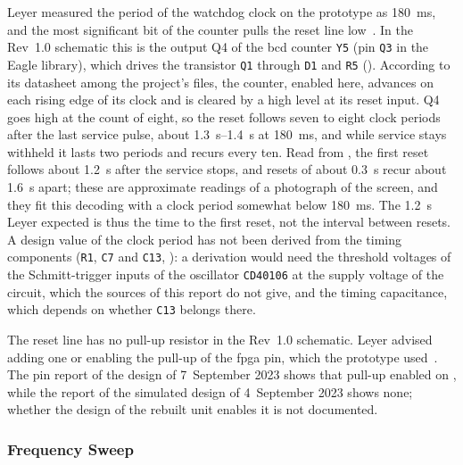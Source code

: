 Leyer measured the period of the watchdog clock on the prototype as \SI{180}{\milli\second}, and the most significant bit of the counter pulls the reset line low~\cite[Sec.~4.6]{leyer2023}. In the Rev~1.0 schematic this is the output Q4 of the \gls{bcd} counter \texttt{Y5} (pin \texttt{Q3} in the Eagle library), which drives the transistor \texttt{Q1} through \texttt{D1} and \texttt{R5} (). According to its datasheet among the project's files, the counter, enabled here, advances on each rising edge of its clock and is cleared by a high level at its reset input. Q4 goes high at the count of eight, so the reset follows seven to eight clock periods after the last service pulse, about \SIrange{1.3}{1.4}{\second} at \SI{180}{\milli\second}, and while service stays withheld it lasts two periods and recurs every ten. Read from , the first reset follows about \SI{1.2}{\second} after the service stops, and resets of about \SI{0.3}{\second} recur about \SI{1.6}{\second} apart; these are approximate readings of a photograph of the screen, and they fit this decoding with a clock period somewhat below \SI{180}{\milli\second}. The \SI{1.2}{\second} Leyer expected is thus the time to the first reset, not the interval between resets. A design value of the clock period has not been derived from the timing components (\texttt{R1}, \texttt{C7} and \texttt{C13}, ): a derivation would need the threshold voltages of the Schmitt-trigger inputs of the oscillator \texttt{CD40106} at the supply voltage of the circuit, which the sources of this report do not give, and the timing capacitance, which depends on whether \texttt{C13} belongs there.

The reset line has no pull-up resistor in the Rev~1.0 schematic. Leyer advised adding one or enabling the pull-up of the \gls{fpga} pin, which the prototype used~\cite[Sec.~9.2]{leyer2023}. The pin report of the design  of 7~September 2023 shows that pull-up enabled on , while the report of the simulated design  of 4~September 2023 shows none; whether the design of the rebuilt unit enables it is not documented.

\subsubsection{Frequency Sweep}

